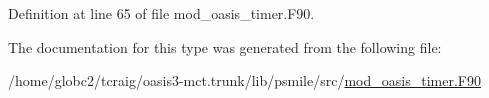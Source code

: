 Definition at line 65 of file mod\+\_\+oasis\+\_\+timer.\+F90.



The documentation for this type was generated from the following file\+:\begin{DoxyCompactItemize}
\item 
/home/globc2/tcraig/oasis3-\/mct.\+trunk/lib/psmile/src/\hyperlink{mod__oasis__timer_8_f90}{mod\+\_\+oasis\+\_\+timer.\+F90}\end{DoxyCompactItemize}
